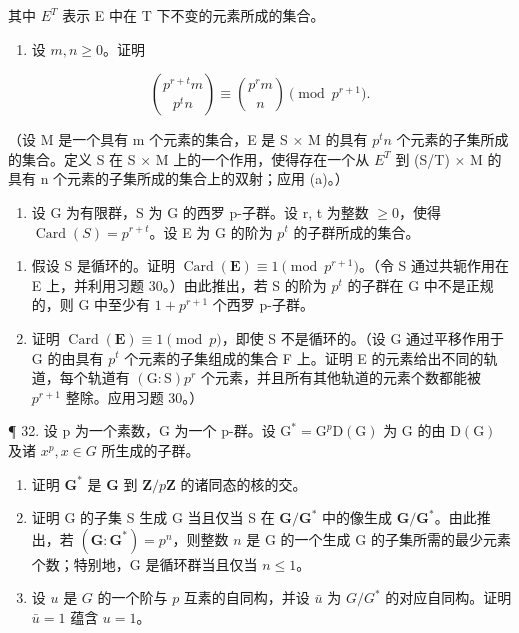 其中 \(E^{T}\) 表示 E 中在 T 下不变的元素所成的集合。

\begin{enumerate}
\def\labelenumi{(\alph{enumi})}
\setcounter{enumi}{1}
\tightlist
\item
  设 \(m, n \geqslant 0\)。证明
\end{enumerate}

\[
\binom {p ^ {r + t} m} {p ^ {t} n} \equiv \binom {p ^ {r} m} {n} \pmod {p ^ {r + 1}}.
\]

（设 M 是一个具有 m 个元素的集合，E 是 S × M 的具有 \(p^{t}n\) 个元素的子集所成的集合。定义 S 在 S × M 上的一个作用，使得存在一个从 \(E^{T}\) 到 (S/T) × M 的具有 n 个元素的子集所成的集合上的双射；应用 (a)。）

\begin{enumerate}
\def\labelenumi{\arabic{enumi}。}
\setcounter{enumi}{30}
\tightlist
\item
  设 G 为有限群，S 为 G 的西罗 p-子群。设 r, t 为整数 \(\geqslant0\)，使得 \(\operatorname{Card}(S)=p^{r+t}\)。设 E 为 G 的阶为 \(p^{t}\) 的子群所成的集合。
\end{enumerate}

\begin{enumerate}
\def\labelenumi{(\alph{enumi})}
\item
  假设 S 是循环的。证明 \(\operatorname{Card}(\mathbf{E}) \equiv 1 \pmod{p^{r+1}}\)。（令 S 通过共轭作用在 E 上，并利用习题 30。）由此推出，若 S 的阶为 \(p^{t}\) 的子群在 G 中不是正规的，则 G 中至少有 \(1 + p^{r+1}\) 个西罗 p-子群。
\item
  证明 \(\operatorname{Card}(\mathbf{E}) \equiv 1 \pmod{p}\)，即使 S 不是循环的。（设 G 通过平移作用于 G 的由具有 \(p^{t}\) 个元素的子集组成的集合 F 上。证明 E 的元素给出不同的轨道，每个轨道有 \((\mathrm{G}: \mathrm{S})p^{r}\) 个元素，并且所有其他轨道的元素个数都能被 \(p^{r+1}\) 整除。应用习题 30。）
\end{enumerate}

¶ 32. 设 p 为一个素数，G 为一个 p-群。设 \(\mathrm{G}^{*} = \mathrm{G}^{p}\mathrm{D}(\mathrm{G})\) 为 G 的由 \(\mathrm{D}(\mathrm{G})\) 及诸 \(x^{p}, x \in G\) 所生成的子群。

\begin{enumerate}
\def\labelenumi{(\alph{enumi})}
\item
  证明 \(\mathbf{G}^*\) 是 \(\mathbf{G}\) 到 \(\mathbf{Z} / p\mathbf{Z}\) 的诸同态的核的交。
\item
  证明 G 的子集 S 生成 G 当且仅当 S 在 \(\mathbf{G} / \mathbf{G}^*\) 中的像生成 \(\mathbf{G} / \mathbf{G}^*\)。由此推出，若 \((\mathbf{G}:\mathbf{G}^{*}) = p^{n}\)，则整数 \(n\) 是 G 的一个生成 G 的子集所需的最少元素个数；特别地，G 是循环群当且仅当 \(n\leqslant 1\)。
\item
  设 \(u\) 是 \(G\) 的一个阶与 \(p\) 互素的自同构，并设 \(\bar{u}\) 为 \(G / G^*\) 的对应自同构。证明 \(\bar{u} = 1\) 蕴含 \(u = 1\)。
\end{enumerate}

